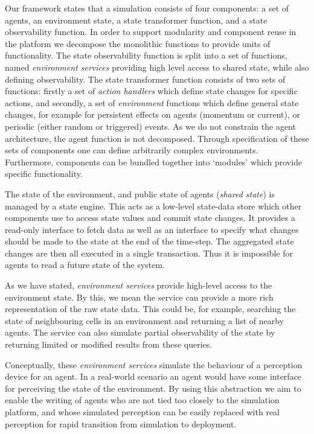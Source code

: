 Our framework states that a simulation consists of four components: a set of
agents, an environment state, a state transformer function, and a state
observability function.  In order to support modularity and component reuse in
the platform we decompose the monolithic functions to provide units of
functionality. The state observability function is split into a set of
functions, named \emph{environment services} providing high level access to
shared state, while also defining observability. The state transformer
function consists of two sets of functions: firstly a set of \emph{action
handlers} which define state changes for specific actions, and secondly, a set
of \emph{environment} functions which define general state changes, for
example for persistent effects on agents (momentum or current), or periodic
(either random or triggered) events.  As we do not constrain the agent
architecture, the agent function is not decomposed. Through specification of
these sets of components one can define arbitrarily complex environments.
Furthermore, components can be bundled together into `modules' which provide
specific functionality.

The state of the environment, and public state of agents (\emph{shared state})
is managed by a state engine. This acts as a low-level state-data store which
other components use to access state values and commit state changes. It
provides a read-only interface to fetch data as well as an interface to
specify what changes should be made to the state at the end of the time-step.
The aggregated state changes are then all executed in a single transaction.
Thus it is impossible for agents to read a future state of the system.

As we have stated, \emph{environment services} provide high-level access to
the environment state. By this, we mean the service can provide a more rich
representation of the raw state data. This could be, for example, searching
the state of neighbouring cells in an environment and returning a list of
nearby agents. The service can also simulate partial observability of the
state by returning limited or modified results from these queries.

Conceptually, these \emph{environment services} simulate the behaviour of a
perception device for an agent. In a real-world scenario an agent would have
some interface for perceiving the state of the environment. By using this
abstraction we aim to enable the writing of agents who are not tied too closely
to the simulation platform, and whose simulated perception can be easily
replaced with real perception for rapid transition from simulation to
deployment.

